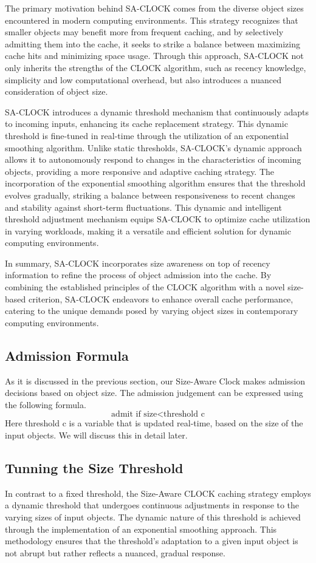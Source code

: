 \documentclass[journal,10.5pt,onecolumn]{IEEEtran}
\begin{document}
The primary motivation behind SA-CLOCK comes from the diverse object sizes encountered in modern computing environments. This strategy recognizes that smaller objects may benefit more from frequent caching, and by selectively admitting them into the cache, it seeks to strike a balance between maximizing cache hits and minimizing space usage. Through this approach, SA-CLOCK not only inherits the strengths of the CLOCK algorithm, such as recency knowledge, simplicity and low computational overhead, but also introduces a nuanced consideration of object size.

SA-CLOCK introduces a dynamic threshold mechanism that continuously adapts to incoming inputs, enhancing its cache replacement strategy. This dynamic threshold is fine-tuned in real-time through the utilization of an exponential smoothing algorithm. Unlike static thresholds, SA-CLOCK's dynamic approach allows it to autonomously respond to changes in the characteristics of incoming objects, providing a more responsive and adaptive caching strategy. The incorporation of the exponential smoothing algorithm ensures that the threshold evolves gradually, striking a balance between responsiveness to recent changes and stability against short-term fluctuations. This dynamic and intelligent threshold adjustment mechanism equips SA-CLOCK to optimize cache utilization in varying workloads, making it a versatile and efficient solution for dynamic computing environments.

In summary, SA-CLOCK incorporates size awareness on top of recency information to refine the process of object admission into the cache. By combining the established principles of the CLOCK algorithm with a novel size-based criterion, SA-CLOCK endeavors to enhance overall cache performance, catering to the unique demands posed by varying object sizes in contemporary computing environments.

\subsection{Admission Formula}
As it is discussed in the previous section, our Size-Aware Clock makes admission decisions based on object size. The admission judgement can be expressed using the following formula.
\[
\text{admit if } \text{size} < \text{threshold} \text{ c}
\]
Here threshold c is a variable that is updated real-time, based on the size of the input objects. We will discuss this in detail later.

\subsection{Tunning the Size Threshold}
In contrast to a fixed threshold, the Size-Aware CLOCK caching strategy employs a dynamic threshold that undergoes continuous adjustments in response to the varying sizes of input objects. The dynamic nature of this threshold is achieved through the implementation of an exponential smoothing approach. This methodology ensures that the threshold's adaptation to a given input object is not abrupt but rather reflects a nuanced, gradual response.
\end{document}
